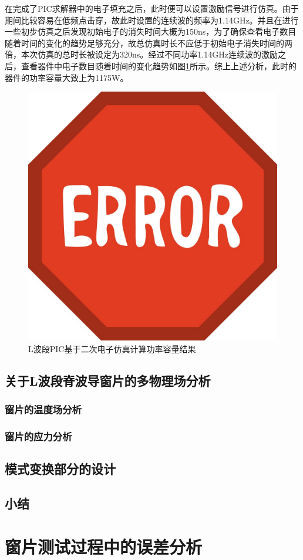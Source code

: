 \documentclass[master]{thesis-uestc}
\begin{document}
在完成了PIC求解器中的电子填充之后，此时便可以设置激励信号进行仿真。由于期间比较容易在低频点击穿，故此时设置的连续波的频率为1.14GHz。并且在进行一些初步仿真之后发现初始电子的消失时间大概为150ns，为了确保查看电子数目随着时间的变化的趋势足够充分，故总仿真时长不应低于初始电子消失时间的两倍，本次仿真的总时长被设定为320ns。经过不同功率1.14GHz连续波的激励之后，查看器件中电子数目随着时间的变化趋势如图\ref{fig:L波段PIC基于二次电子仿真计算功率容量结果}所示。综上上述分析，此时的器件的功率容量大致上为1175W。
\begin{figure}[!htb]
    \centering
    \includegraphics[width=0.5\linewidth]{pic/ERROR.jpg}
    \caption{L波段PIC基于二次电子仿真计算功率容量结果}
    \label{fig:L波段PIC基于二次电子仿真计算功率容量结果}
\end{figure}

\section{关于L波段脊波导窗片的多物理场分析}
\subsection{窗片的温度场分析}
\subsection{窗片的应力分析}
\section{模式变换部分的设计}
\section{小结}
\chapter{窗片测试过程中的误差分析}
\end{document}
